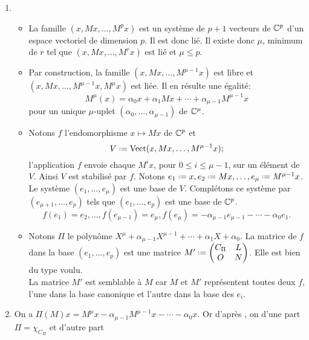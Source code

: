 \begin{solution}
    \begin{enumerate}
        \item 
        \begin{itemize}
            \item La famille $(x, Mx, \dots, M^p x)$ est un système de $p+1$ vecteurs de $\mathbb{C}^p$ d'un espace vectoriel de dimension $p$. Il est donc lié. Il existe donc $\mu$, minimum de $r$ tel que $(x, Mx, \dots, M^r x)$ est lié et $\mu \leqslant p$. 
            \item Par construction, la famille  $(x, Mx, \dots, M^{\mu-1} x)$ est libre et $(x, Mx, \dots, M^{\mu-1} x, M^\mu x)$ est liée. Il en résulte une égalité: 
            $$M^\mu(x) = \alpha_0 x + \alpha_1 M x + \cdots + \alpha_{\mu-1} M^{\mu-1} x$$
            pour un unique $\mu$-uplet $(\alpha_0, \dots, \alpha_{\mu-1})$ de $\mathbb{C}^\mu$. \\
            \item Notons $f$ l'endomorphisme $x \mapsto Mx$ de $\mathbb{C}^p$ et 
            $$V \defeq \Vect(x, Mx, \dots, M^{\mu-1} x);$$
            l'application $f$ envoie chaque $M^i x$, pour $0 \leqslant i \leqslant \mu - 1$, sur un élément de $V$. Ainsi $V$ est stabilisé par $f$.
            Notons $e_1 \defeq x, e_2 \defeq M x, \dots, e_\mu \defeq M^{\mu-1} x$. Le système $(e_1, \dots, e_\mu)$ est une base de $V$. Complétons ce système par $(e_{\mu+1}, \dots, e_p)$ tels que $(e_1, \dots, e_p)$ est une base de $\mathbb{C}^p$. 
            $$f(e_1) = e_2, \dots, f(e_{\mu-1}) = e_\mu, f(e_\mu) = -\alpha_{\mu-1} e_{\mu-1} - \cdots - \alpha_0 e_1.$$
            \item Notons $\Pi$ le polynôme $X^\mu + \alpha_{\mu-1} X^{\mu-1} + \cdots + \alpha_1 X + \alpha_0$. La matrice de $f$ dans la base $(e_1, \dots, e_p)$ est une matrice 
            $M' \defeq
            \begin{pmatrix}
                C_\Pi & L \\
                O & N
            \end{pmatrix}
            $. Elle est bien du type voulu. \\
            La matrice $M'$ est semblable à $M$ car $M$ et $M'$ représentent toutes deux $f$, l'une dans la base canonique et l'autre dans la base des $e_i$. 
        \end{itemize}
        \item On a $\Pi(M)x = M^\mu x - \alpha_{\mu-1}M^{\mu-1}x - \cdots - \alpha_0 x$. Or d'après , on d'une part $\Pi = \chi_{C_\Pi}$ et d'autre part 

\end{enumerate}
\end{solution}
